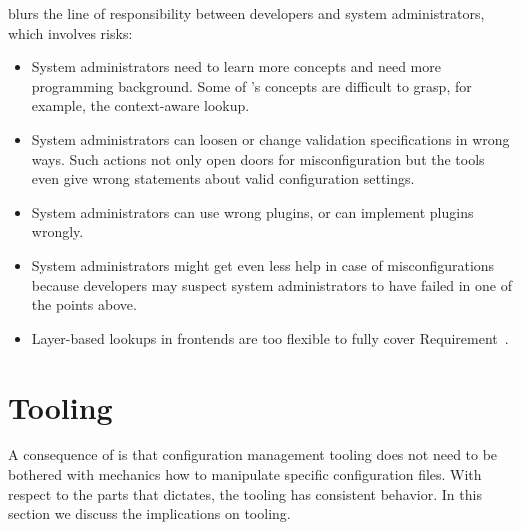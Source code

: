  blurs the line of responsibility between developers and system administrators, which involves risks:
\begin{itemize}
\item
System administrators need to learn more concepts and need more programming background.
Some of \elektra{}'s concepts are difficult to grasp, for example, the context-aware lookup.
\item
System administrators can loosen or change validation specifications in wrong ways.
Such actions not only open doors for misconfiguration but the tools even give wrong statements about valid configuration settings.
\item
System administrators can use wrong plugins, or can implement plugins wrongly.
\item
System administrators might get even less help in case of misconfigurations because developers may suspect system administrators to have failed in one of the points above.
\item
Layer-based lookups in frontends are too flexible to fully cover Requirement~.
\end{itemize}





















































\section{Tooling}
\label{sec:tooling}

A consequence of  is that configuration management tooling does not need to be bothered with mechanics how to manipulate specific configuration files.
With respect to the parts that  dictates, the tooling has consistent behavior.
In this section we discuss the implications on tooling.


